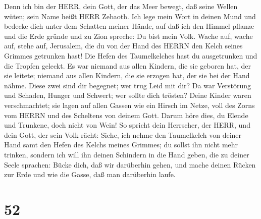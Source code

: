  Denn ich bin der HERR, dein Gott, der das Meer bewegt, daß
seine Wellen wüten; sein Name heißt HERR Zebaoth.  Ich lege
mein Wort in deinen Mund und bedecke dich unter dem Schatten meiner
Hände, auf daß ich den Himmel pflanze und die Erde gründe und zu Zion
spreche: Du bist mein Volk.  Wache auf, wache auf, stehe
auf, Jerusalem, die du von der Hand des HERRN den Kelch seines Grimmes
getrunken hast! Die Hefen des Taumelkelches hast du ausgetrunken und die
Tropfen geleckt.  Es war niemand aus allen Kindern, die sie
geboren hat, der sie leitete; niemand aus allen Kindern, die sie erzogen
hat, der sie bei der Hand nähme.  Diese zwei sind dir
begegnet; wer trug Leid mit dir? Da war Verstörung und Schaden, Hunger
und Schwert; wer sollte dich trösten?  Deine Kinder waren
verschmachtet; sie lagen auf allen Gassen wie ein Hirsch im Netze, voll
des Zorns vom HERRN und des Scheltens von deinem Gott. 
Darum höre dies, du Elende und Trunkene, doch nicht von Wein!
 So spricht dein Herrscher, der HERR, und dein Gott, der
sein Volk rächt: Siehe, ich nehme den Taumelkelch von deiner Hand samt
den Hefen des Kelchs meines Grimmes; du sollst ihn nicht mehr trinken,
 sondern ich will ihn deinen Schindern in die Hand geben,
die zu deiner Seele sprachen: Bücke dich, daß wir darüberhin gehen, und
mache deinen Rücken zur Erde und wie die Gasse, daß man darüberhin
laufe.

\hypertarget{section-51}{%
\section{52}\label{section-51}}

